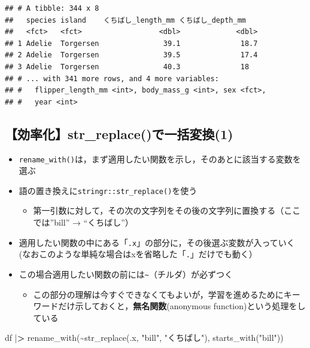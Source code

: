 \documentclass[
  xelatex,ja=standard, b5paper]{bxjsbook}
\newenvironment{Shaded}{\begin{snugshade}}{\end{snugshade}}
\newcommand{\ErrorTok}[1]{\textcolor[rgb]{0.64,0.00,0.00}{\textbf{#1}}}
\newcommand{\FunctionTok}[1]{\textcolor[rgb]{0.00,0.00,0.00}{#1}}
\newcommand{\NormalTok}[1]{#1}
\newcommand{\SpecialCharTok}[1]{\textcolor[rgb]{0.00,0.00,0.00}{#1}}
\newcommand{\StringTok}[1]{\textcolor[rgb]{0.31,0.60,0.02}{#1}}
\providecommand{\tightlist}{%
  \setlength{\itemsep}{0pt}\setlength{\parskip}{0pt}}
\begin{document}
\begin{verbatim}
## # A tibble: 344 x 8
##   species island    くちばし_length_mm くちばし_depth_mm
##   <fct>   <fct>                  <dbl>             <dbl>
## 1 Adelie  Torgersen               39.1              18.7
## 2 Adelie  Torgersen               39.5              17.4
## 3 Adelie  Torgersen               40.3              18  
## # ... with 341 more rows, and 4 more variables:
## #   flipper_length_mm <int>, body_mass_g <int>, sex <fct>,
## #   year <int>
\end{verbatim}

\hypertarget{rename-strreplace1}{%
\subsection{【効率化】str\_replace()で一括変換(1)}\label{rename-strreplace1}}

\begin{itemize}
\tightlist
\item
  \texttt{rename\_with()}は，まず適用したい関数を示し，そのあとに該当する変数を選ぶ
\item
  語の置き換えに\texttt{stringr::str\_replace()}を使う

  \begin{itemize}
  \tightlist
  \item
    第一引数に対して，その次の文字列をその後の文字列に置換する（ここでは''bill'' → ``くちばし''）
  \end{itemize}
\item
  適用したい関数の中にある「\texttt{.x}」の部分に，その後選ぶ変数が入っていく(なおこのような単純な場合はxを省略した「\texttt{.}」だけでも動く）
\item
  この場合適用したい関数の前には\texttt{\textasciitilde{}}（チルダ）が必ずつく

  \begin{itemize}
  \tightlist
  \item
    この部分の理解は今すぐできなくてもよいが，学習を進めるためにキーワードだけ示しておくと，\textbf{無名関数}(anonymous function)という処理をしている
  \end{itemize}
\end{itemize}

\begin{Shaded}
\begin{Highlighting}[]
\NormalTok{df }\SpecialCharTok{|}\ErrorTok{\textgreater{}} 
  \FunctionTok{rename\_with}\NormalTok{(}\SpecialCharTok{\textasciitilde{}}\FunctionTok{str\_replace}\NormalTok{(.x, }\StringTok{"bill"}\NormalTok{, }\StringTok{"くちばし"}\NormalTok{),}
              \FunctionTok{starts\_with}\NormalTok{(}\StringTok{"bill"}\NormalTok{))}
\end{Highlighting}
\end{Shaded}
\end{document}
